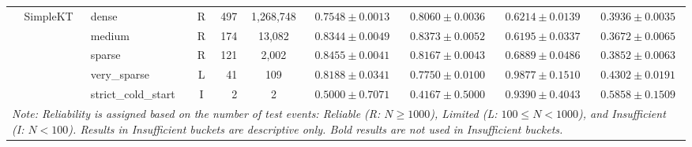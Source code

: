 \begin{table}[tbp]
{\begin{tabular}{lllcrccccc}
 & SimpleKT & dense & R & 497 & 1,268,748 & $0.7548 \pm 0.0013$ & $0.8060 \pm 0.0036$ & $0.6214 \pm 0.0139$ & $0.3936 \pm 0.0035$ \\
 &  & medium & R & 174 & 13,082 & $0.8344 \pm 0.0049$ & $0.8373 \pm 0.0052$ & $0.6195 \pm 0.0337$ & $0.3672 \pm 0.0065$ \\
 &  & sparse & R & 121 & 2,002 & $0.8455 \pm 0.0041$ & $0.8167 \pm 0.0043$ & $0.6889 \pm 0.0486$ & $0.3852 \pm 0.0063$ \\
 &  & very\_sparse & L & 41 & 109 & $0.8188 \pm 0.0341$ & $0.7750 \pm 0.0100$ & $0.9877 \pm 0.1510$ & $0.4302 \pm 0.0191$ \\
 &  & strict\_cold\_start & I & 2 & 2 & $0.5000 \pm 0.7071$ & $0.4167 \pm 0.5000$ & $0.9390 \pm 0.4043$ & $0.5858 \pm 0.1509$ \\
\bottomrule
\multicolumn{10}{p{8.2cm}}{\scriptsize \textit{Note: Reliability is assigned based on the number of test events: Reliable (R: $N \ge 1000$), Limited (L: $100 \le N < 1000$), and Insufficient (I: $N < 100$). Results in Insufficient buckets are descriptive only. Bold results are not used in Insufficient buckets.}} \\
\end{tabular}%
}
\end{table}
